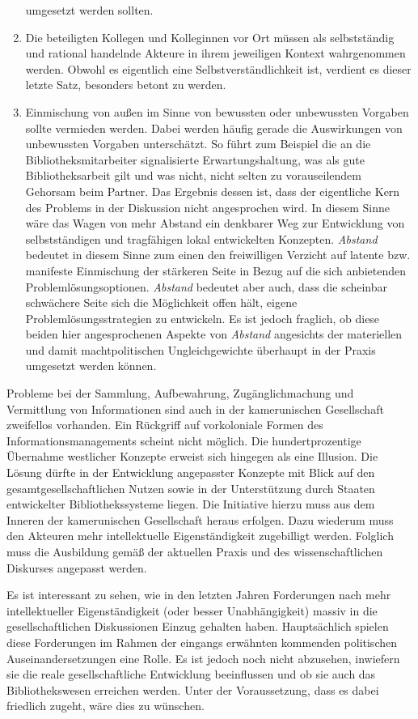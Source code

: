 \documentclass[a4paper,
fontsize=11pt,
oneside,
numbers=noperiodatend,
parskip=half-,
bibliography=totoc,
final
]{scrartcl}
\begin{document}
\begin{enumerate}
  umgesetzt werden sollten.
\item
  Die beteiligten Kollegen und Kolleginnen vor Ort müssen als
  selbstständig und rational handelnde Akteure in ihrem jeweiligen
  Kontext wahrgenommen werden. Obwohl es eigentlich eine
  Selbstverständlichkeit ist, verdient es dieser letzte Satz, besonders
  betont zu werden.
\item
  Einmischung von außen im Sinne von bewussten oder unbewussten Vorgaben
  sollte vermieden werden. Dabei werden häufig gerade die Auswirkungen
  von unbewussten Vorgaben unterschätzt. So führt zum Beispiel die an
  die Bibliotheksmitarbeiter signalisierte Erwartungshaltung, was als
  gute Bibliotheksarbeit gilt und was nicht, nicht selten zu
  vorauseilendem Gehorsam beim Partner. Das Ergebnis dessen ist, dass
  der eigentliche Kern des Problems in der Diskussion nicht angesprochen
  wird. In diesem Sinne wäre das Wagen von mehr Abstand ein denkbarer
  Weg zur Entwicklung von selbstständigen und tragfähigen lokal
  entwickelten Konzepten. \emph{Abstand} bedeutet in diesem Sinne zum
  einen den freiwilligen Verzicht auf latente bzw. manifeste Einmischung
  der stärkeren Seite in Bezug auf die sich anbietenden
  Problemlösungsoptionen. \emph{Abstand} bedeutet aber auch, dass die
  scheinbar schwächere Seite sich die Möglichkeit offen hält, eigene
  Problemlösungsstrategien zu entwickeln. Es ist jedoch fraglich, ob
  diese beiden hier angesprochenen Aspekte von \emph{Abstand} angesichts
  der materiellen und damit machtpolitischen Ungleichgewichte überhaupt
  in der Praxis umgesetzt werden können.
\end{enumerate}

Probleme bei der Sammlung, Aufbewahrung, Zugänglichmachung und
Vermittlung von Informationen sind auch in der kamerunischen
Gesellschaft zweifellos vorhanden. Ein Rückgriff auf vorkoloniale Formen
des Informationsmanagements scheint nicht möglich. Die hundertprozentige
Übernahme westlicher Konzepte erweist sich hingegen als eine Illusion.
Die Lösung dürfte in der Entwicklung angepasster Konzepte mit Blick auf
den gesamtgesellschaftlichen Nutzen sowie in der Unterstützung durch
Staaten entwickelter Bibliothekssysteme liegen. Die Initiative hierzu
muss aus dem Inneren der kamerunischen Gesellschaft heraus erfolgen.
Dazu wiederum muss den Akteuren mehr intellektuelle Eigenständigkeit
zugebilligt werden. Folglich muss die Ausbildung gemäß der aktuellen
Praxis und des wissenschaftlichen Diskurses angepasst werden.

Es ist interessant zu sehen, wie in den letzten Jahren Forderungen nach
mehr intellektueller Eigenständigkeit (oder besser Unabhängigkeit)
massiv in die gesellschaftlichen Diskussionen Einzug gehalten haben.
Hauptsächlich spielen diese Forderungen im Rahmen der eingangs erwähnten
kommenden politischen Auseinandersetzungen eine Rolle. Es ist jedoch
noch nicht abzusehen, inwiefern sie die reale gesellschaftliche
Entwicklung beeinflussen und ob sie auch das Bibliothekswesen erreichen
werden. Unter der Voraussetzung, dass es dabei friedlich zugeht, wäre
dies zu wünschen.
\end{document}
